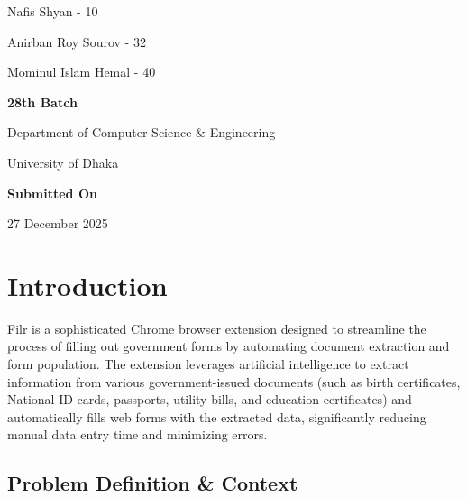 \documentclass[11pt, a4paper]{article}
\theoremstyle{plain}
\theoremstyle{definition}
\begin{document}
\begin{titlepage}
    \vspace{0.6cm}
    
    {\normalsize Nafis Shyan - 10\par}
    \vspace{0.3cm}
    {\normalsize Anirban Roy Sourov - 32\par}
    \vspace{0.3cm}
    {\normalsize Mominul Islam Hemal - 40\par}
    
    \vspace{0.8cm}
    
    {\normalsize \textbf{28th Batch}\par}
    {\normalsize Department of Computer Science \& Engineering\par}
    {\normalsize University of Dhaka\par}
    
    \vspace{1.2cm}
    
    {\normalsize \textbf{Submitted On}\par}
    {\normalsize 27 December 2025\par}
    
    \vspace{0.5cm}
    
\end{titlepage}

\newpage
\tableofcontents

\newpage   

\section{Introduction}

Filr is a sophisticated Chrome browser extension designed to streamline the process of filling out government forms by automating document extraction and form population. The extension leverages artificial intelligence to extract information from various government-issued documents (such as birth certificates, National ID cards, passports, utility bills, and education certificates) and automatically fills web forms with the extracted data, significantly reducing manual data entry time and minimizing errors.

\subsection{Problem Definition \& Context}
\end{document}

